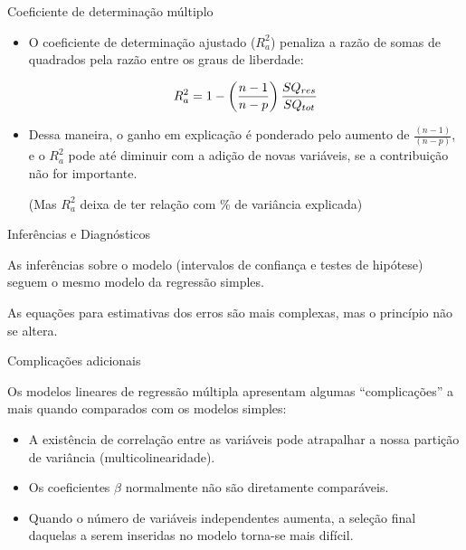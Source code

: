 \documentclass{beamer}\usepackage[]{graphicx}\usepackage[]{color}
\begin{document}
\begin{frame}{Coeficiente de determinação múltiplo}

\begin{itemize}

\item O coeficiente de determinação ajustado ($R^2_a$) penaliza a razão de somas de quadrados pela razão entre os graus de liberdade:

\begin{equation*}
\centering
R^2_a = 1 - \left(\frac{n-1}{n-p}\right) \frac{SQ_{res}}{SQ_{tot}}
\end{equation*}

\pause
\item Dessa maneira, o ganho em explicação é ponderado pelo aumento de $\frac{(n-1)}{(n-p)}$, e o $R^2_a$ pode até diminuir com a adição de novas variáveis, se a contribuição não for importante.

\vfill

(Mas $R^2_a$ deixa de ter relação com \% de variância explicada)

\end{itemize}

\end{frame}


\begin{frame}{Inferências e Diagnósticos}

As inferências sobre o modelo (intervalos de confiança e testes de hipótese) seguem o mesmo modelo da regressão simples.

\vfill
As equações para estimativas dos erros são mais complexas, mas o princípio não se altera.

\end{frame}


\begin{frame}{Complicações adicionais}

Os modelos lineares de regressão múltipla apresentam algumas ``complicações'' a mais quando comparados com os modelos simples:
\vfill
\begin{itemize}

\item A existência de correlação entre as variáveis pode atrapalhar a nossa partição de variância (multicolinearidade).
\vfill
\item Os coeficientes $\beta$ normalmente não são diretamente comparáveis.
\vfill
\item Quando o número de variáveis independentes aumenta, a seleção final daquelas a serem inseridas no modelo torna-se mais difícil.
\vfill

\end{itemize}

\end{frame}
\end{document}
